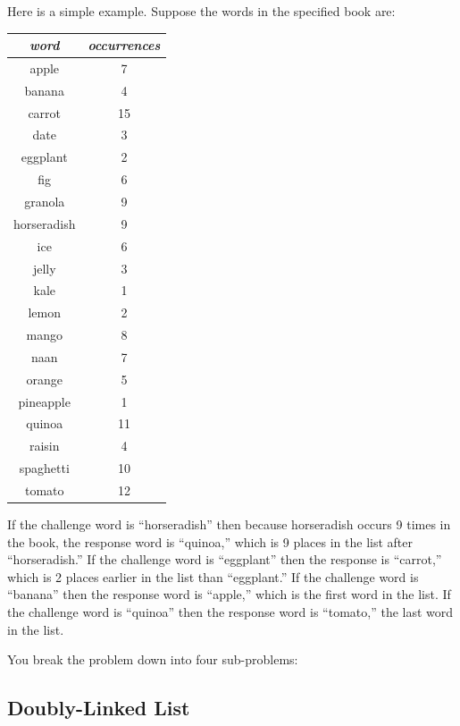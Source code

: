 Here is a simple example. Suppose the words in the specified book are:

\begin{center}
\begin{tabular}{cc}
\textit{word} & \textit{occurrences} \\ \hline
apple       & 7 \\
banana      & 4 \\
carrot      & 15 \\
date        & 3 \\
eggplant    & 2 \\
fig         & 6 \\
granola     & 9 \\
horseradish & 9 \\
ice         & 6 \\
jelly       & 3 \\
kale        & 1 \\
lemon       & 2 \\
mango       & 8 \\
naan        & 7 \\
orange      & 5 \\
pineapple   & 1 \\
quinoa      & 11 \\
raisin      & 4 \\
spaghetti   & 10 \\
tomato      & 12 \\
\end{tabular}
\end{center}
If the challenge word is ``horseradish'' then because horseradish occurs 9
times in the book, the response word is ``quinoa,'' which is 9 places in the
list after ``horseradish.'' If the challenge word is ``eggplant'' then the
response is ``carrot,'' which is 2 places earlier in the list than
``eggplant.'' If the challenge word is ``banana'' then the response word is
``apple,'' which is the first word in the list. If the challenge word is
``quinoa'' then the response word is ``tomato,'' the last word in the list.

You break the problem down into four sub-problems:

\subsection{Doubly-Linked List}

